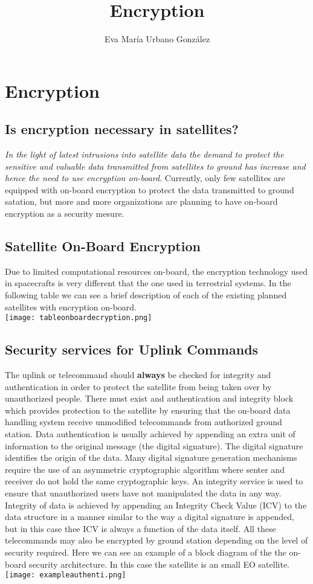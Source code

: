\documentclass[12pt,a4paper]{report}
\author{Eva María Urbano González}
\title{Encryption}
\begin{document}
\maketitle
\chapter{Encryption}
\section{Is encryption necessary in satellites?}
\textit{In the light of latest intrusions into satellite data the demand to protect the sensitive and valuable data transmitted from satellites to ground has increase and hence the need to use encryption on-board}\cite{Sayeda2007}. 
Currently, only few satellites are equipped with on-board encryption to protect the data transmitted to ground satation, but more and more organizations are planning to have on-board encryption as a security mesure.
\section{Satellite On-Board Encryption}
Due to limited computational resources on-board, the encryption technology used in spacecrafts is very different that the one used in terrestrial systems. In the following table we can see a brief description of each of the existing planned satellites with encryption on-board.\\
\texttt{[image: tableonboardecryption.png]} \\
\section{Security services for Uplink Commands}
The uplink or telecommand should \textbf{always} be checked for integrity and authentication in order to protect the satellite from being taken over by unauthorized people. There must exist and authentication and integrity block which provides protection to the satellite by ensuring that the on-board data handling system receive unmodified telecommands from authorized ground station. Data authentication is usually achieved by appending an extra unit of information to the original message (the digital signature).  The digital signature identifies the origin of the data. Many digital signature generation mechanisms require the use of an asymmetric cryptographic algorithm where senter and receiver do not hold the same cryptographic keys. An integrity service is used to ensure that unauthorized users have not manipulated the data in any way. Integrity of data is achieved by appending an Integrity Check Value (ICV) to the data structure in a manner similar to the way  a digital signature is appended, but in this case thee ICV is always a function of the data itself. All these telecommands may also be encrypted by ground station depending on the level of security required. 
Here we can see an example of a block diagram of the the on-board security architecture. In this case the satellite is an small EO satellite. \\
\texttt{[image: exampleauthenti.png]}  
\end{document}

